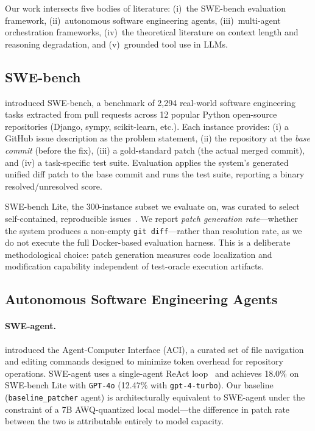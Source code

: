 
Our work intersects five bodies of literature: (i)~the SWE-bench evaluation
framework, (ii)~autonomous software engineering agents,
(iii)~multi-agent orchestration frameworks, (iv)~the theoretical literature
on context length and reasoning degradation, and (v)~grounded tool use in
LLMs.

\subsection{SWE-bench}

\citet{jimenez2024swebench} introduced SWE-bench, a benchmark of 2,294
real-world software engineering tasks extracted from pull requests across 12
popular Python open-source repositories (Django, sympy, scikit-learn, etc.).
Each instance provides: (i) a GitHub issue description as the problem
statement, (ii) the repository at the \emph{base commit} (before the fix),
(iii) a gold-standard patch (the actual merged commit), and (iv) a
task-specific test suite. Evaluation applies the system's generated unified
diff patch to the base commit and runs the test suite, reporting a binary
resolved/unresolved score.

SWE-bench Lite, the 300-instance subset we evaluate on, was curated to
select self-contained, reproducible issues~\cite{jimenez2024swebench}. We
report \emph{patch generation rate}---whether the system produces a
non-empty \texttt{git diff}---rather than resolution rate, as we do not
execute the full Docker-based evaluation harness. This is a deliberate
methodological choice: patch generation measures code localization
and modification capability independent of test-oracle execution artifacts.

\subsection{Autonomous Software Engineering Agents}

\paragraph{SWE-agent.}
\citet{yang2024sweagent} introduced the Agent-Computer Interface (ACI),
a curated set of file navigation and editing commands designed to minimize
token overhead for repository operations. SWE-agent uses a single-agent
ReAct loop~\cite{yao2023react} and achieves 18.0\% on SWE-bench Lite with
\texttt{GPT-4o} (12.47\% with \texttt{gpt-4-turbo}). Our baseline
(\texttt{baseline\_patcher} agent) is architecturally equivalent to
SWE-agent under the constraint of a 7B AWQ-quantized local model---the
difference in patch rate between the two is attributable entirely to model
capacity.

